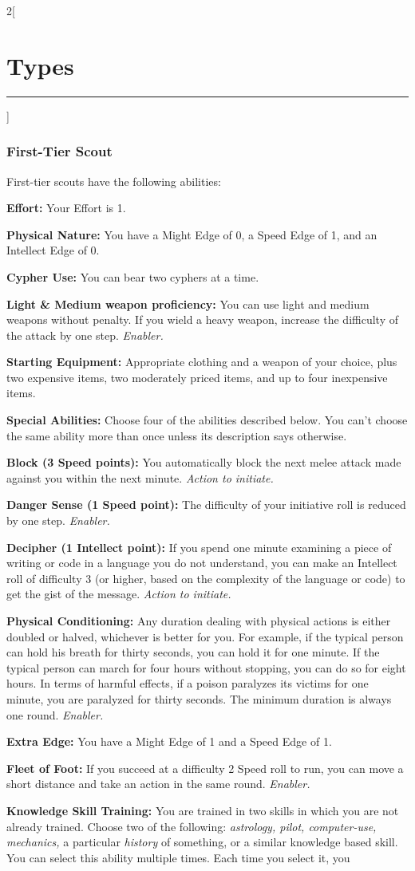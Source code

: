 \documentclass[a4paper,10pt,final]{book}
\newcommand{\HRule}{\rule{\linewidth}{0.5mm}} %
\newcommand{\newSection}[1]{\section*{#1} \addcontentsline{toc}{section}{#1} \label{sec:#1} \HRule}
\newcommand{\itemLine}[2]{\textbf{#1:} {#2}\par}
\newcommand{\itemAbility}[2]{\textcolor{25gray}{\textbullet\textbf{ #1:}} {#2}\par}
\newcommand{\enabler}{\textit{ Enabler.}}
\newcommand{\actionInit}{\textit{ Action to initiate.}}
\newenvironment{docsection}[1]
{
  \begin{multicols*}{2}[\newSection{#1}]
}
{
  \end{multicols*}
  \newpage
}
\begin{document}
\begin{docsection}{Types}
\subsubsection*{First-Tier Scout}
\label{subsub:scoutFirstTier}
First-tier scouts have the following abilities: \par
\itemLine{Effort}{Your Effort is 1.} 
\itemLine{Physical Nature} {You have a Might Edge
of 0, a Speed Edge of 1, and an Intellect Edge of 0.}
\itemLine{Cypher Use}{You can bear two cyphers at a time.}
\itemLine{Light \& Medium weapon proficiency} {You can use light and medium
weapons without penalty. If you wield a
heavy weapon, increase the difficulty of the
attack by one step.\enabler}
\itemLine{Starting Equipment}{Appropriate clothing
and a weapon of your choice, plus two
expensive items, two moderately priced
items, and up to four inexpensive items.}
\itemLine{Special Abilities}{Choose four of the
abilities described below. You can’t choose
the same ability more than once unless its
description says otherwise.}
\itemAbility{Block (3 Speed points)}{You automatically
block the next melee attack made against
you within the next minute.\actionInit}
\itemAbility{Danger Sense (1 Speed point)}{The
difficulty of your initiative roll is reduced by
one step.\enabler}
\itemAbility{Decipher (1 Intellect point)}{If you spend
one minute examining a piece of writing or
code in a language you do not understand,
you can make an Intellect roll of difficulty
3 (or higher, based on the complexity of
the language or code) to get the gist of the
message.\actionInit}
\itemAbility{Physical Conditioning}{Any duration dealing with
physical actions is either doubled or halved,
whichever is better for you. For example,
if the typical person can hold his breath
for thirty seconds, you can hold it for one minute. 
If the typical person can march
for four hours without stopping, you can
do so for eight hours. In terms of harmful
effects, if a poison paralyzes its victims for
one minute, you are paralyzed for thirty
seconds. The minimum duration is always
one round.\enabler}
\itemAbility{Extra Edge}{You have a Might Edge of 1
and a Speed Edge of 1.}
\itemAbility{Fleet of Foot}{If you succeed at a difficulty
2 Speed roll to run, you can move a short
distance and take an action in the same
round.\enabler}
\itemAbility{Knowledge Skill Training}{You are trained in two
skills in which you are not already trained.
Choose two of the following: \textit{astrology, pilot, computer-use, mechanics,} a particular \textit{history} of something, or a similar knowledge based skill. 
You can select this ability multiple times. Each time you select it, you
}
\end{docsection}
\end{document}
